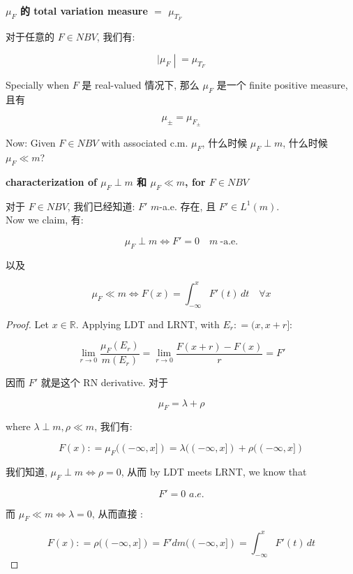 \documentclass{qlnotes-export}
\begin{document}
\begin{theorem}{\protect{}\label{kn-mu-f-total-variation-measure-mu-t-f}{\textbf{\(\mu_{F}\)
的 total variation measure \(=\) \(\mu_{T_{F}}\)}}}

对于任意的 \(F \in NBV\), 我们有:

\[\left. |\mu_{F} \middle| = \mu_{T_{F}} \right.\]

Specially when \(F\) 是 real-valued 情况下, 那么 \(\mu_{F}\) 是一个 finite positive measure, 且有

\[\mu_{\pm} = \mu_{F_{\pm}}\]

\end{theorem}

Now: Given \(F \in NBV\) with associated c.m. \(\mu_{F}\), 什么时候 \(\mu_{F} \perp m\), 什么时候 \(\mu_{F} \ll m\)?

\begin{theorem}{\protect{}\label{kn-characterization-of-mu-f-perp-m-mu-f-ll-m-for-f-in-nbv}{\textbf{characterization
of \(\mu_{F} \perp m\) 和 \(\mu_{F} \ll m\), for \(F \in NBV\)}}}

对于 \(F \in NBV\), 我们已经知道: \(F'\) \(m\)-a.e. 存在, 且 \(F' \in L^{1}(m)\).\\
Now we claim, 有:

\[\mu_{F} \perp m\Leftrightarrow F' = 0\quad m\ \text{-a.e.}\]

以及

\[\mu_{F} \ll m\Leftrightarrow F(x) = \int_{- \infty}^{x}F'(t)\, dt\quad\forall x\]

\end{theorem}

\begin{proof}

Let \(x \in {\mathbb{R}}\). Applying LDT and LRNT, with \(E_{r}: = (x,x + r\rbrack\):

\[\lim\limits_{r\rightarrow 0}\frac{\mu_{F}(E_{r})}{m(E_{r})} = \lim\limits_{r\rightarrow 0}\frac{F(x + r) - F(x)}{r} = F'\]

因而 \(F'\) 就是这个 RN derivative. 对于

\[\mu_{F} = \lambda + \rho\]

where \(\lambda \perp m,\rho \ll m\), 我们有:

\[F(x): = \mu_{F}(( - \infty,x\rbrack) = \lambda(( - \infty,x\rbrack) + \rho(( - \infty,x\rbrack)\]

我们知道, \(\mu_{F} \perp m\Leftrightarrow\rho = 0\), 从而 by LDT meets LRNT, we know that

\[F' = 0\,\, a.e.\]

而 \(\mu_{F} \ll m\Leftrightarrow\lambda = 0\), 从而直接 :

\[F(x): = \rho(( - \infty,x\rbrack) = F'dm(( - \infty,x\rbrack) = \int_{- \infty}^{x}F'(t)\, dt\]

\end{proof}
\end{document}
